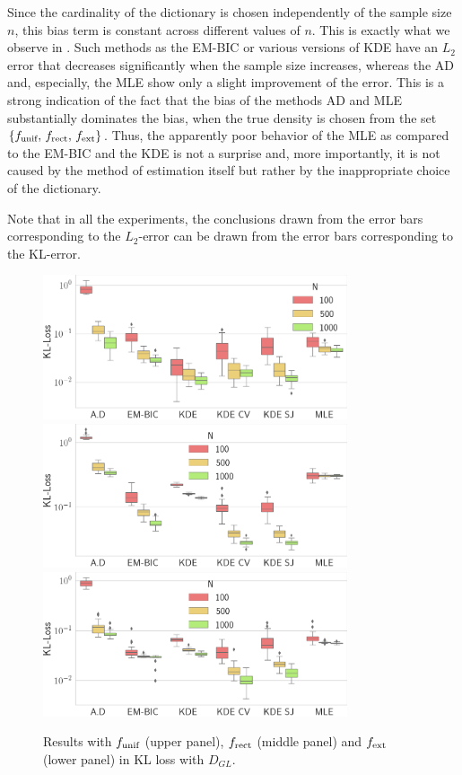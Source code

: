 Since the cardinality of the dictionary is chosen
independently of the sample size $n$, this bias term is constant across different values of $n$. This is 
exactly what we observe in . Such methods as the EM-BIC or various versions of KDE
have an $L_2$ error that decreases significantly when the sample size increases, whereas the AD and, especially, 
the MLE show only a slight improvement of the error. This is a strong indication of the fact that
the bias of the methods AD and MLE substantially dominates the bias, when the true density is chosen from 
the set $\{f_{\textnormal{unif}},\,f_{\textnormal{rect}},\,f_{\textnormal{ext}}\}$. Thus, the apparently
poor behavior of the MLE as compared to the EM-BIC and the KDE is not a surprise and, more importantly,
it is not caused by the method of estimation itself but rather by the inappropriate choice of the
dictionary.

Note that in all the experiments, the conclusions drawn from the error bars corresponding to the 
$L_2$-error can be drawn from the error bars corresponding to the KL-error. 

\begin{figure}
\center
    \includegraphics[width=0.8\textwidth]{./TeX_files/res_uniform_KL_GL.png}
    \includegraphics[width=0.8\textwidth]{./TeX_files/res_rect_KL_GL.png}
    \includegraphics[width=0.8\textwidth]{./TeX_files/res_lapl_gauss_not_dict_KL_GL.png}
    \caption{Results with $f_{\textnormal{unif}}$ (upper panel), $f_{\textnormal{rect}}$ 
    (middle panel) and $f_{\textnormal{ext}}$ (lower panel) in KL loss with $D_{GL}$.}
    \label{fig:res_ext_KL_GL}
\end{figure}


